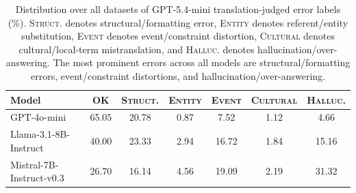 \begin{table}[t]
\centering
\small
\begin{tabular}{lcccccc}
\toprule
Model & \textsc{OK} & \textsc{Struct.} & \textsc{Entity} & \textsc{Event} & \textsc{Cultural} & \textsc{Halluc.} \\
\midrule
GPT-4o-mini & 65.05 & 20.78 & 0.87 & 7.52 & 1.12 & 4.66 \\
Llama-3.1-8B-Instruct & 40.00 & 23.33 & 2.94 & 16.72 & 1.84 & 15.16 \\
Mistral-7B-Instruct-v0.3 & 26.70 & 16.14 & 4.56 & 19.09 & 2.19 & 31.32 \\
\bottomrule
\end{tabular}
\caption{Distribution over all datasets of GPT-5.4-mini translation-judged error labels (\%). \textsc{Struct.} denotes structural/formatting error, \textsc{Entity} denotes referent/entity substitution, \textsc{Event} denotes event/constraint distortion, \textsc{Cultural} denotes cultural/local-term mistranslation, and \textsc{Halluc.} denotes hallucination/over-answering. The most prominent errors across all models are structural/formatting errors, event/constraint distortions, and hallucination/over-answering.}
\label{tab:mt1_audit_merged}
\end{table}
